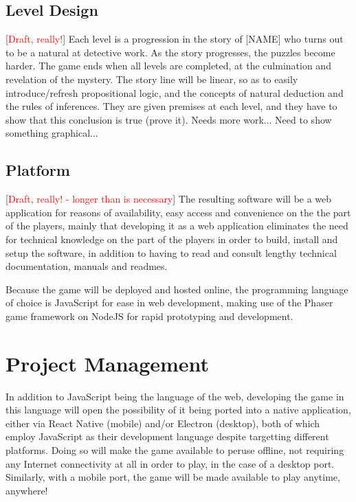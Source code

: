 \documentclass[a4paper]{article}
\newcommand{\comment}[1]{[\textcolor{red}{#1}]} %
\begin{document}
\subsection{Level Design}
\comment{Draft, really!} Each level is a progression in the story of [NAME] who turns out to be a natural at detective work. As the story progresses, the puzzles become harder. The game ends when all levels are completed, at the culmination and revelation of the mystery. The story line will be linear, so as to easily introduce/refresh propositional logic, and the concepts of natural deduction and the rules of inferences. They are given premises at each level, and they have to show that this conclusion is true (prove it). Needs more work... Need to show something graphical...


\subsection{Platform}
\comment{Draft, really! - longer than is necessary}  The resulting software will be a web application for reasons of availability, easy access and convenience on the the part of the players, mainly that developing it as a web application eliminates the need for technical knowledge on the part of the players in order to build, install and setup the software, in addition to having to read and consult lengthy technical documentation, manuals and readmes.

Because the game will be deployed and hosted online, the programming language of choice is JavaScript for ease in web development, making use of the Phaser game framework on NodeJS for rapid prototyping and development.

\section{Project Management} %
In addition to JavaScript being the language of the web, developing the game in this language will open the possibility of it being ported into a native application, either via React Native (mobile) and/or Electron (desktop), both of which employ JavaScript as their development language despite targetting different platforms. Doing so will make the game available to peruse offline, not requiring any Internet connectivity at all in order to play, in the case of a desktop port. Similarly, with a mobile port, the game will be made available to play anytime, anywhere!
\end{document}

